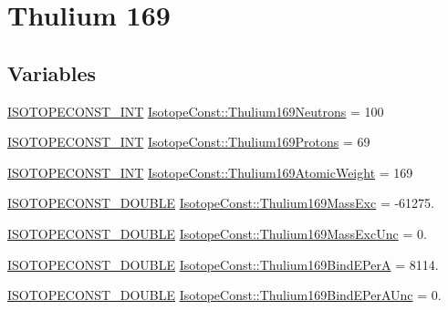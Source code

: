 \hypertarget{group___isotope_const-_thulium-_tm169}{}\section{Thulium 169}
\label{group___isotope_const-_thulium-_tm169}
\subsection*{Variables}
\begin{DoxyCompactItemize}
\item 
\mbox{\hyperlink{group___isotope_const-_macros_ga5f18360b3e99483a35c32d789e62621c}{I\+S\+O\+T\+O\+P\+E\+C\+O\+N\+S\+T\+\_\+\+I\+NT}} \mbox{\hyperlink{group___isotope_const-_thulium-_tm169_ga09f2edf34cb06de3dc0963d533187904}{Isotope\+Const\+::\+Thulium169\+Neutrons}} = 100
\item 
\mbox{\hyperlink{group___isotope_const-_macros_ga5f18360b3e99483a35c32d789e62621c}{I\+S\+O\+T\+O\+P\+E\+C\+O\+N\+S\+T\+\_\+\+I\+NT}} \mbox{\hyperlink{group___isotope_const-_thulium-_tm169_ga7e3c46316d472bce02cf91c1ae4e4833}{Isotope\+Const\+::\+Thulium169\+Protons}} = 69
\item 
\mbox{\hyperlink{group___isotope_const-_macros_ga5f18360b3e99483a35c32d789e62621c}{I\+S\+O\+T\+O\+P\+E\+C\+O\+N\+S\+T\+\_\+\+I\+NT}} \mbox{\hyperlink{group___isotope_const-_thulium-_tm169_gac618c3a620eb842260c0fd74bb03d41a}{Isotope\+Const\+::\+Thulium169\+Atomic\+Weight}} = 169
\item 
\mbox{\hyperlink{group___isotope_const-_macros_ga8f45a7272ce02c0b4c65c44636ed719a}{I\+S\+O\+T\+O\+P\+E\+C\+O\+N\+S\+T\+\_\+\+D\+O\+U\+B\+LE}} \mbox{\hyperlink{group___isotope_const-_thulium-_tm169_ga30a00fe6227c0a8cc344b796b36d9b06}{Isotope\+Const\+::\+Thulium169\+Mass\+Exc}} = -\/61275.
\item 
\mbox{\hyperlink{group___isotope_const-_macros_ga8f45a7272ce02c0b4c65c44636ed719a}{I\+S\+O\+T\+O\+P\+E\+C\+O\+N\+S\+T\+\_\+\+D\+O\+U\+B\+LE}} \mbox{\hyperlink{group___isotope_const-_thulium-_tm169_ga26493ef7ed56edf2b155352038d50f10}{Isotope\+Const\+::\+Thulium169\+Mass\+Exc\+Unc}} = 0.
\item 
\mbox{\hyperlink{group___isotope_const-_macros_ga8f45a7272ce02c0b4c65c44636ed719a}{I\+S\+O\+T\+O\+P\+E\+C\+O\+N\+S\+T\+\_\+\+D\+O\+U\+B\+LE}} \mbox{\hyperlink{group___isotope_const-_thulium-_tm169_ga67883620706e081ce9d761ebcad7802b}{Isotope\+Const\+::\+Thulium169\+Bind\+E\+PerA}} = 8114.
\item 
\mbox{\hyperlink{group___isotope_const-_macros_ga8f45a7272ce02c0b4c65c44636ed719a}{I\+S\+O\+T\+O\+P\+E\+C\+O\+N\+S\+T\+\_\+\+D\+O\+U\+B\+LE}} \mbox{\hyperlink{group___isotope_const-_thulium-_tm169_ga4db4950db9731713c1de05a62f713f0d}{Isotope\+Const\+::\+Thulium169\+Bind\+E\+Per\+A\+Unc}} = 0.

\end{DoxyCompactItemize}
